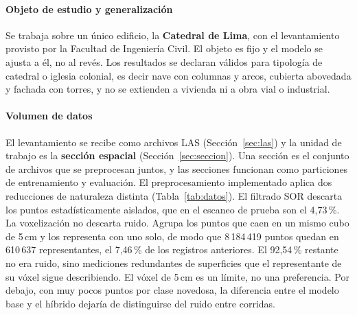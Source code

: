 
\paragraph*{Objeto de estudio y generalización}
Se trabaja sobre un único edificio, la \textbf{Catedral de Lima}, con el
levantamiento provisto por la Facultad de Ingeniería Civil. El objeto es fijo y
el modelo se ajusta a él, no al revés. Los resultados se declaran válidos para tipología de catedral o iglesia colonial,
es decir nave con columnas y arcos, cubierta abovedada y fachada con torres, y no
se extienden a vivienda ni a obra vial o industrial.

\paragraph*{Volumen de datos}
El levantamiento se recibe como archivos LAS (Sección~\ref{sec:las}) y la unidad
de trabajo es la \textbf{sección espacial} (Sección~\ref{sec:seccion}). Una sección es el conjunto de
archivos que se preprocesan juntos, y las secciones funcionan como particiones de
entrenamiento y evaluación. El preprocesamiento
implementado aplica dos reducciones de naturaleza distinta
(Tabla~\ref{tab:datos}). El filtrado SOR descarta los puntos estadísticamente
aislados, que en el escaneo de prueba son el 4,73\,\%. La voxelización no
descarta ruido. Agrupa los puntos que caen en un mismo cubo de 5\,cm y los
representa con uno solo, de modo que 8\,184\,419 puntos quedan en 610\,637
representantes, el 7,46\,\% de los registros anteriores. El 92,54\,\% restante
no era ruido, sino mediciones redundantes de superficies que el representante
de su vóxel sigue describiendo. El vóxel de 5\,cm es un límite, no una
preferencia. Por debajo, con muy pocos puntos por clase novedosa, la diferencia
entre el modelo base y el híbrido dejaría de distinguirse del ruido entre
corridas.

